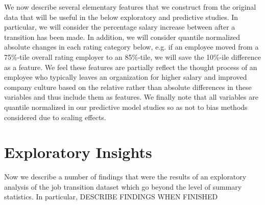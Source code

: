 \documentclass[10pt]{article}
\begin{document}
We now describe several elementary features that we construct from the original data that 
will be useful in the below exploratory and predictive studies.  In particular, we will 
consider the percentage salary increase between after a transition has been made. 
In addition, we will consider quantile normalized absolute changes in each rating 
category below, e.g. if an employee moved from a 75\%-tile overall rating employer 
to an 85\%-tile, we will save the 10\%-ile difference as a feature.  We feel these 
features are partially reflect the thought process of an employee who typically leaves an organization 
for higher salary and improved company culture based on the relative rather than absolute 
differences in these variables and thus include them as features.  We finally note that 
all variables are quantile normalized in our predictive model studies so as not to bias 
methods considered due to scaling effects.

\section{Exploratory Insights}

Now we describe a number of findings that were the results of an exploratory analysis of 
the job transition dataset which go beyond the level of summary statistics.  In particular, 
DESCRIBE FINDINGS WHEN FINISHED
\end{document}
